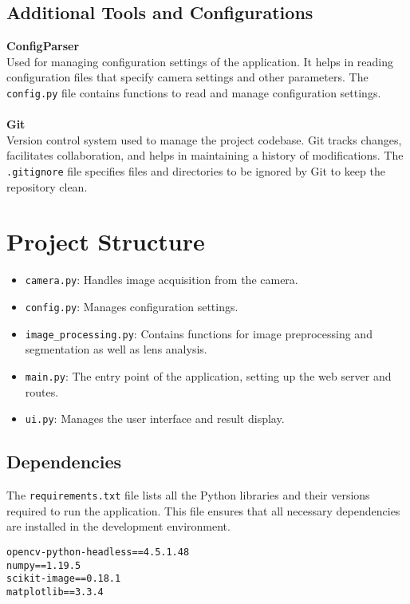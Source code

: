 \subsection{Additional Tools and Configurations}

\textbf{ConfigParser}
\\
Used for managing configuration settings of the application. It helps in reading configuration files that specify camera settings and other parameters. The \texttt{config.py} file contains functions to read and manage configuration settings.
\\
\\
\textbf{Git}
\\
Version control system used to manage the project codebase. Git tracks changes, facilitates collaboration, and helps in maintaining a history of modifications. The \texttt{.gitignore} file specifies files and directories to be ignored by Git to keep the repository clean.

\section{Project Structure}

\begin{itemize}
    \item \texttt{camera.py}: Handles image acquisition from the camera.
    \item \texttt{config.py}: Manages configuration settings.
    \item \texttt{image\_processing.py}: Contains functions for image preprocessing and segmentation as well as lens analysis.
    \item \texttt{main.py}: The entry point of the application, setting up the web server and routes.
    \item \texttt{ui.py}: Manages the user interface and result display.
\end{itemize}

\subsection{Dependencies}

The \texttt{requirements.txt} file lists all the Python libraries and their versions required to run the application. This file ensures that all necessary dependencies are installed in the development environment.

\begin{verbatim}
opencv-python-headless==4.5.1.48
numpy==1.19.5
scikit-image==0.18.1
matplotlib==3.3.4
\end{verbatim}

